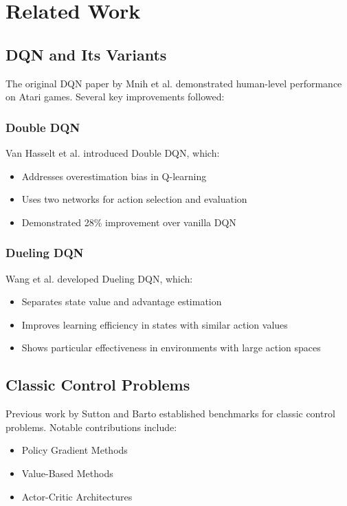 \documentclass[conference]{IEEEtran}
\begin{document}
\section{Related Work}
\subsection{DQN and Its Variants}
The original DQN paper by Mnih et al. \cite{mnih2015human} demonstrated human-level performance on Atari games. Several key improvements followed:

\subsubsection{Double DQN}
Van Hasselt et al. \cite{hasselt2016deep} introduced Double DQN, which:
\begin{itemize}
    \item Addresses overestimation bias in Q-learning
    \item Uses two networks for action selection and evaluation
    \item Demonstrated 28\% improvement over vanilla DQN
\end{itemize}

\subsubsection{Dueling DQN}
Wang et al. \cite{wang2016dueling} developed Dueling DQN, which:
\begin{itemize}
    \item Separates state value and advantage estimation
    \item Improves learning efficiency in states with similar action values
    \item Shows particular effectiveness in environments with large action spaces
\end{itemize}

\subsection{Classic Control Problems}
Previous work by Sutton and Barto \cite{sutton2018reinforcement} established benchmarks for classic control problems. Notable contributions include:
\begin{itemize}
    \item Policy Gradient Methods
    \item Value-Based Methods
    \item Actor-Critic Architectures
\end{itemize}
\end{document}
